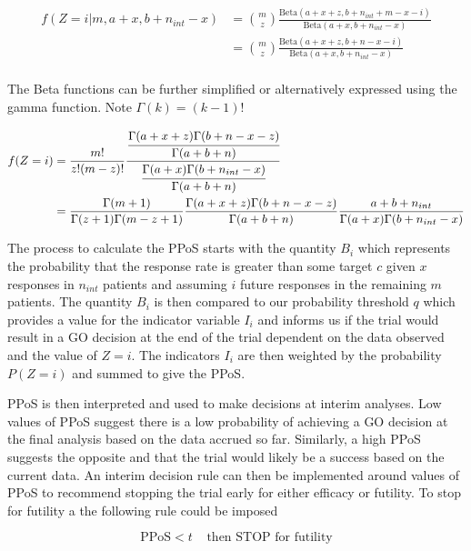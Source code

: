 \begin{equation}
	\begin{aligned}
		f(Z = i|m, a+x, b+n_{int}-x) & = {m\choose z} \frac{\text{Beta}(a+x+z, b+n_{int}+m-x-i)}{\text{Beta}(a+x, b+n_{int}-x)} \\
		& = {m\choose z} \frac{\text{Beta}(a+x+z, b+n-x-i)}{\text{Beta}(a+x, b+n_{int}-x)} \\
	\end{aligned}
\end{equation}

The Beta functions can be further simplified or alternatively expressed using the gamma function. Note $\Gamma(k) = (k-1)!$

\small
\begin{equation}
	\begin{aligned}
		f(Z = i) & = \frac{m!}{z!(m-z)!}\cfrac{\cfrac{\Gamma(a+x+z)\Gamma(b+n-x-z)}{\Gamma(a+b+n)}}{\cfrac{\Gamma(a+x)\Gamma(b+n_{int}-x)}{\Gamma(a+b+n)}} \\
		& = \frac{\Gamma(m+1)}{\Gamma(z+1)\Gamma(m-z+1)}\frac{\Gamma(a+x+z)\Gamma(b+n-x-z)}{\Gamma(a+b+n)}\frac{a+b+n_{int}}{\Gamma(a+x)\Gamma(b+n_{int}-x)}
	\end{aligned}
\end{equation}
\normalsize

The process to calculate the PPoS starts with the quantity $B_i$ which represents the probability that the response rate is greater than some target $c$ given $x$ responses in $n_{int}$ patients and assuming $i$ future responses in the remaining $m$ patients. The quantity $B_i$ is then compared to our probability threshold $q$ which provides a value for the indicator variable $I_i$ and informs us if the trial would result in a GO decision at the end of the trial dependent on the data observed and the value of $Z=i$. The indicators $I_i$ are then weighted by the probability $P(Z=i)$ and summed to give the PPoS. 

PPoS is then interpreted and used to make decisions at interim analyses. Low values of PPoS suggest there is a low probability of achieving a GO decision at the final analysis based on the data accrued so far. Similarly, a high PPoS suggests the opposite and that the trial would likely be a success based on the current data. An interim decision rule can then be implemented around values of PPoS to recommend stopping the trial early for either efficacy or futility. To stop for futility a the following rule could be imposed 

\begin{equation}
	\text{PPoS} < t  \; \; \; \; \text{then STOP for futility}
\end{equation}

